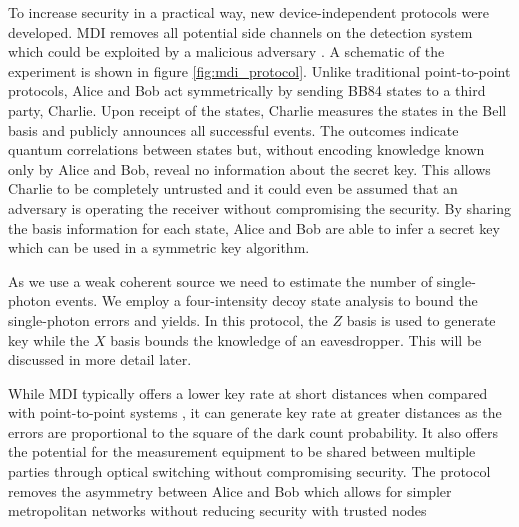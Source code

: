 To increase security in a practical way, new device-independent protocols were developed. \ac{MDI} removes all potential side channels on the detection system which could be exploited by a malicious adversary \cite{mdi-qkd}. A schematic of the experiment is shown in figure \ref{fig:mdi_protocol}. Unlike traditional point-to-point protocols, Alice and Bob act symmetrically by sending BB84 states to a third party, Charlie. Upon receipt of the states, Charlie measures the states in the Bell basis and publicly announces all successful events. The outcomes indicate quantum correlations between states but, without encoding knowledge known only by Alice and Bob, reveal no information about the secret key. This allows Charlie to be completely untrusted and it could even be assumed that an adversary is operating the receiver without compromising the security. By sharing the basis information for each state, Alice and Bob are able to infer a secret key which can be used in a symmetric key algorithm. 

As we use a weak coherent source we need to estimate the number of single-photon events. We employ a four-intensity decoy state analysis \cite{zhou2016} to bound the single-photon errors and yields. In this protocol, the $Z$ basis is used to generate key while the $X$ basis bounds the knowledge of an eavesdropper. This will be discussed in more detail later.

While \ac{MDI} typically offers a lower key rate at short distances when compared with point-to-point systems \cite{Sibson2017InP}, it can generate key rate at greater distances \cite{yin2016} as the errors are proportional to the square of the dark count probability. It also offers the potential for the measurement equipment to be shared between multiple parties through optical switching without compromising security. The protocol removes the  asymmetry between Alice and Bob which allows for simpler metropolitan networks without reducing security with trusted nodes




